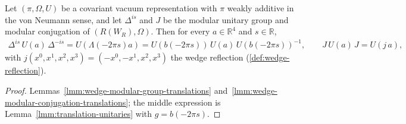 \begin{theorem}
    \label{thrm:wedge-modular-translations}
    \leanok
    Let $(\pi, \Omega, U)$ be a covariant vacuum representation with $\pi$ weakly additive in the von Neumann sense, and let $\Delta^{is}$ and $J$ be the modular unitary group and modular conjugation of $(R(W_R), \Omega)$. Then for every $a \in \mathbb{R}^4$ and $s \in \mathbb{R}$,
    \begin{align}
        \Delta^{is}\,U(a)\,\Delta^{-is} = U(\Lambda(-2\pi s)a) = U(b(-2\pi s))\,U(a)\,U(b(-2\pi s))^{-1}, \qquad J\,U(a)\,J = U(j\,a),
    \end{align}
    with $j(x^0, x^1, x^2, x^3) = (-x^0, -x^1, x^2, x^3)$ the wedge reflection (\ref{def:wedge-reflection}).
\end{theorem}
\begin{proof}
    \leanok
    Lemmas~\ref{lmm:wedge-modular-group-translations} and~\ref{lmm:wedge-modular-conjugation-translations}; the middle expression is Lemma~\ref{lmm:translation-unitaries} with $g = b(-2\pi s)$.
\end{proof}

